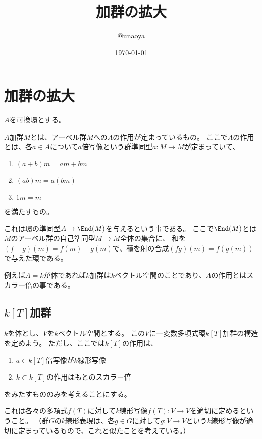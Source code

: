 \documentclass{jsarticle}
\title{加群の拡大}
\author{@unaoya}
\date{\today}                                           %
\begin{document}
\maketitle

\section{加群の拡大}
$A$を可換環とする。
\begin{dfn}
$A$加群$M$とは、アーベル群$M$への$A$の作用が定まっているもの。
ここで$A$の作用とは、各$a\in A$について$a$倍写像という群準同型$a:M \to M$が定まっていて、
\begin{enumerate}
\item $(a+b)m=am+bm$
\item $(ab)m=a(bm)$
\item $1m=m$
\end{enumerate}
を満たすもの。
\end{dfn}

これは環の準同型$A \to \End(M)$を与えるという事である。
ここで$\End(M)$とは$M$のアーベル群の自己準同型$M \to M$全体の集合に、
和を$(f+g)(m)=f(m)+g(m)$で、積を射の合成$(fg)(m)=f(g(m))$で与えた環である。

例えば$A=k$が体であれば$k$加群は$k$ベクトル空間のことであり、$A$の作用とはスカラー倍の事である。

\subsection{$k[T]$加群}
$k$を体とし、$V$を$k$ベクトル空間とする。
この$V$に一変数多項式環$k[T]$加群の構造を定めよう。
ただし、ここでは$k[T]$の作用は、
\begin{enumerate}
\item $a\in k[T]$倍写像が$k$線形写像
\item $k\subset k[T]$の作用はもとのスカラー倍
\end{enumerate}
をみたすもののみを考えることにする。

これは各々の多項式$f(T)$に対して$k$線形写像$f(T):V \to V$を適切に定めるということ。
（群$G$の$k$線形表現は、各$g\in G$に対して$g:V \to V$という$k$線形写像が適切に定まっているもので、これと似たことを考えている。）
\end{document}
